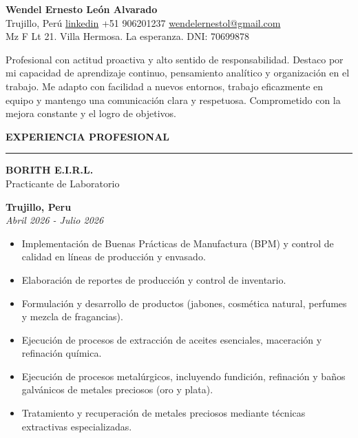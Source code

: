 \documentclass[11pt]{article}
\newcommand{\NombreTam}{24}
\newcommand{\NombreX}{2.5}
\begin{document}
{\hspace{\NombreX cm}\fontsize{\NombreTam pt}{28pt}\selectfont\bfseries Wendel Ernesto León Alvarado}\\[2pt]
{\small Trujillo, Perú \hspace{7em}\raisebox{0.3ex}{\scalebox{0.55}{\textbullet}} \href{https://www.linkedin.com/in/wendel-ernesto-leon-alvarado-a079002ab}{linkedin} \hspace{7em}\raisebox{0.3ex}{\scalebox{0.55}{\textbullet}} +51 906201237 \hspace{7em}\raisebox{0.3ex}{\scalebox{0.55}{\textbullet}} \href{mailto:wendelernestol@gmail.com}{wendelernestol@gmail.com}}\\[1pt]
{\small Mz F Lt 21. Villa Hermosa. La esperanza. \hspace{25em} DNI: 70699878}

\vspace{6pt}

Profesional con actitud proactiva y alto sentido de responsabilidad. Destaco por mi capacidad de aprendizaje continuo,
pensamiento analítico y organización en el trabajo. Me adapto con facilidad a nuevos entornos, trabajo eficazmente en
equipo y mantengo una comunicación clara y respetuosa. Comprometido con la mejora constante y el logro de objetivos.

\vspace{8pt}

{\large\bfseries EXPERIENCIA PROFESIONAL}
\vspace{1.5pt}
\hrule

\begin{minipage}[t]{0.55\textwidth}
\textbf{\fontsize{10}{12}\selectfont BORITH E.I.R.L.} \\
Practicante de Laboratorio
\end{minipage}%
\begin{minipage}[t]{0.45\textwidth}
\raggedleft
\textbf{Trujillo, Peru} \\
\textit{Abril 2026 - Julio 2026}
\end{minipage}
\begin{itemize}
  \item Implementación de Buenas Prácticas de Manufactura (BPM) y control de calidad en líneas de producción y envasado.
  \item Elaboración de reportes de producción y control de inventario.
  \item Formulación y desarrollo de productos (jabones, cosmética natural, perfumes y mezcla de fragancias).
  \item Ejecución de procesos de extracción de aceites esenciales, maceración y refinación química.
  \item Ejecución de procesos metalúrgicos, incluyendo fundición, refinación y baños galvánicos de metales preciosos (oro y plata).
  \item Tratamiento y recuperación de metales preciosos mediante técnicas extractivas especializadas.

\end{itemize}
\vspace{4pt}
\end{document}
